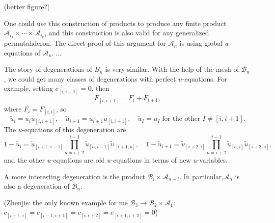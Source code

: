 \documentclass[hidelinks,12pt]{article}
\begin{document}
(better figure?)

One could use this construction of products to produce any finite product $\mathscr A_{i_1}\times \cdots \times \mathscr A_{i_k}$, and this construction is also valid for any generalized permutahderon. 
The direct proof of this argument for $\mathscr A_n$ is using global $u$-equations of $\mathscr A_n$. ...

The story of degenerations of $B_n$ is very similar. 
With the help of the mesh of $\mathscr B_n$, we could get many classes of degenerations with perfect $u$-equations. 
For example, setting $c_{[i,i+1]}=0$, then
\[
	F_{[i,i+1]}=F_{i}+F_{i+1},
\]
where $F_i=F_{[i,i]}$, so 
\[
	\tilde u_{i}=u_{i} u_{[i,i+1]},\quad 
	\tilde u_{i+1}=u_{i+1} u_{[i,i+1]},\quad 
	\tilde u_I=u_I \text{ for the other $I\neq [i,i+1]$}.
\]
The $u$-equations of this degeneration are
\[
	1-\tilde u_i=\tilde u_{[i+1,i-1]}
	\prod_{a=i+2}^{i-1}\tilde u_{[a,i-1]}\tilde u_{[i+1,a]},\quad
	1-\tilde u_{i+1}=
	\tilde u_{[i+2,i]}\prod_{a=i+2}^{i-1}\tilde u_{[a,i]}\tilde u_{[i+2,a]},
\]
and the other $u$-equations are old $u$-equations in terms of new $u$-variables.

A more interesting degeneration is the product $\mathscr B_i\times \mathscr A_{n-i}$.
In particular,$\mathscr A_n$ is also a degeneration of $\mathscr B_n$.

(Zhenjie: the only known example for me $\mathscr B_3\to \mathscr B_{2}\times \mathscr A_1$: $c_{[i-1,i]}=c_{[i-1,i+1]}=c_{[i,i+2]}=c_{[i+1,i+2]}=0$)

\end{document}
